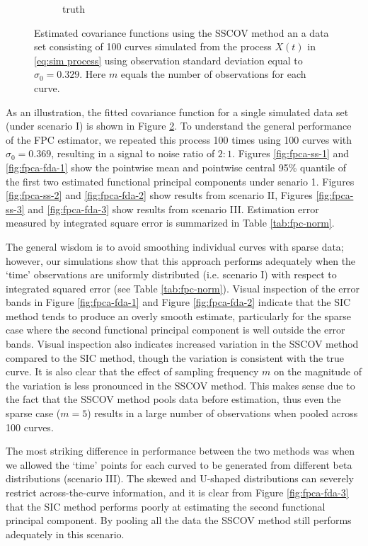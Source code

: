 \begin{figure}
\begin{subfigure}[b]{0.40\textwidth}
                \caption{truth}
                \label{}
        \end{subfigure}
        \caption{Estimated covariance functions using the SSCOV method an a data set consisting of 100 curves simulated from the process $X(t)$ in \eqref{eq:sim process} using observation standard deviation equal to $\sigma_0 = 0.329$. Here $m$ equals the number of observations for each curve. }
        \label{fig:covfits}
\end{figure}
As an illustration, the fitted covariance function for a single simulated data set (under scenario I) is shown in Figure \ref{fig:covfits}. To understand the general performance of the FPC estimator, we repeated this process 100 times using 100 curves with $\sigma_0=0.369$, resulting in a signal to noise ratio of $2:1$. Figures \ref{fig:fpca-ss-1} and \ref{fig:fpca-fda-1} show the pointwise mean and pointwise central 95\% quantile of the first two estimated functional principal components under senario 1.  Figures \ref{fig:fpca-ss-2} and \ref{fig:fpca-fda-2} show results from scenario II, Figures \ref{fig:fpca-ss-3} and \ref{fig:fpca-fda-3} show results from scenario III. Estimation error measured by integrated square error is summarized in Table \ref{tab:fpc-norm}. 

The general wisdom is to avoid smoothing individual curves with sparse data; however, our simulations show that this approach performs adequately when the `time' observations are uniformly distributed (i.e. scenario I) with respect to integrated squared error (see Table \ref{tab:fpc-norm}). Visual inspection of the error bands in Figure \ref{fig:fpca-fda-1} and Figure \ref{fig:fpca-fda-2} indicate that the SIC method tends to produce an overly smooth estimate, particularly for the sparse case where the second functional principal component is well outside the error bands. Visual inspection also indicates increased variation in the SSCOV method compared to the SIC method, though the variation is consistent with the true curve. It is also clear that the effect of sampling frequency $m$ on the magnitude of the variation is less pronounced in the SSCOV method. This makes sense due to the fact that the SSCOV method pools data before estimation, thus even the sparse case ($m = 5$) results in a large number of observations when pooled across 100 curves. 

The most striking difference in performance between the two methods was when we allowed the `time' points for each curved to be generated from different beta distributions (scenario III). The skewed and U-shaped distributions can severely restrict across-the-curve information, and it is clear from Figure \ref{fig:fpca-fda-3} that the SIC method performs poorly at estimating the second functional principal component. By pooling all the data the SSCOV method still performs adequately in this scenario. 

